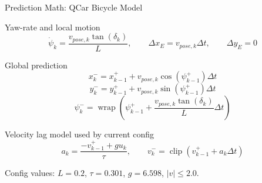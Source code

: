 \documentclass[aspectratio=169,11pt]{beamer}
\newcommand{\wrap}{\operatorname{wrap}}
\begin{document}
\begin{frame}{Prediction Math: QCar Bicycle Model}
  \small
  \begin{block}{Yaw-rate and local motion}
    \[
      \dot{\psi}_k =
      \frac{v_{pose,k}\tan(\delta_k)}{L},
      \qquad
      \Delta x_E = v_{pose,k}\Delta t,
      \qquad
      \Delta y_E = 0
    \]
  \end{block}

  \begin{block}{Global prediction}
    \vspace{-0.4em}
    \[
      x_k^- = x_{k-1}^+ + v_{pose,k}\cos(\psi_{k-1}^+)\Delta t
    \]
    \[
      y_k^- = y_{k-1}^+ + v_{pose,k}\sin(\psi_{k-1}^+)\Delta t
    \]
    \[
      \psi_k^- =
      \wrap\left(\psi_{k-1}^+
      + \frac{v_{pose,k}\tan(\delta_k)}{L}\Delta t\right)
    \]
    \vspace{-0.8em}
  \end{block}

  \begin{block}{Velocity lag model used by current config}
    \vspace{-0.6em}
    \[
      a_k =
      \frac{-v_{k-1}^{+} + g u_k}{\tau},
      \qquad
      v_k^- =
      \operatorname{clip}
      \left(v_{k-1}^{+}+a_k\Delta t\right)
    \]
    \vspace{-0.8em}
  \end{block}

  \vspace{-0.5em}
  \small
  Config values: $L=0.2$, $\tau=0.301$, $g=6.598$, $|v|\leq 2.0$.

\end{frame}
\end{document}
